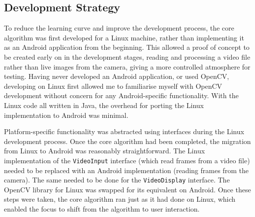 \subsection{Development Strategy}

To reduce the learning curve and improve the development process, the core algorithm was first developed for a Linux machine, rather than implementing it as an Android application from the beginning. This allowed a proof of concept to be created early on in the development stages, reading and processing a video file rather than live images from the camera, giving a more controlled atmosphere for testing. Having never developed an Android application, or used OpenCV, developing on Linux first allowed me to familiarise myself with OpenCV development without concern for any Android-specific functionality. With the Linux code all written in Java, the overhead for porting the Linux implementation to Android was minimal.

Platform-specific functionality was abstracted using interfaces during the Linux development process. Once the core algorithm had been completed, the migration from Linux to Android was reasonably straightforward. The Linux implementation of the \verb!VideoInput! interface (which read frames from a video file) needed to be replaced with an Android implementation (reading frames from the camera). The same needed to be done for the \verb!VideoDisplay! interface. The OpenCV library for Linux was swapped for its equivalent on Android. Once these steps were taken, the core algorithm ran just as it had done on Linux, which enabled the focus to shift from the algorithm to user interaction.